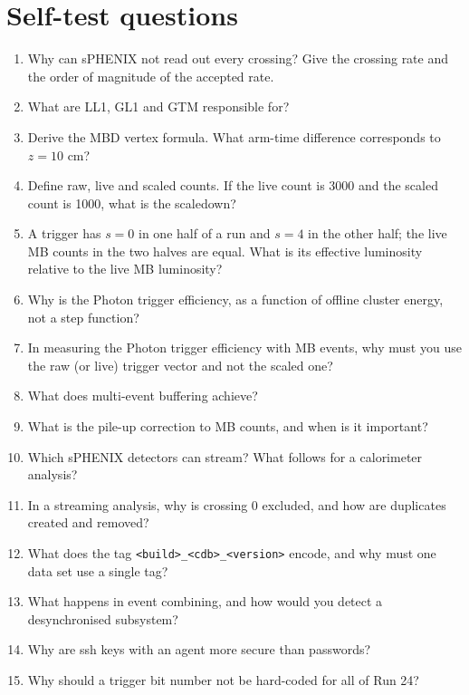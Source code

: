 \documentclass[11pt,letterpaper]{article}
\newcommand{\code}[1]{\texttt{#1}}
\begin{document}
\section{Self-test questions}
\begin{enumerate}
\item Why can sPHENIX not read out every crossing? Give the crossing rate and the order of magnitude of the accepted rate.
\item What are LL1, GL1 and GTM responsible for?
\item Derive the MBD vertex formula. What arm-time difference corresponds to $z=10$ cm?
\item Define raw, live and scaled counts. If the live count is 3000 and the scaled count is 1000, what is the scaledown?
\item A trigger has $s=0$ in one half of a run and $s=4$ in the other half; the live MB counts in the two halves are equal. What is its effective luminosity relative to the live MB luminosity?
\item Why is the Photon trigger efficiency, as a function of offline cluster energy, not a step function?
\item In measuring the Photon trigger efficiency with MB events, why must you use the raw (or live) trigger vector and not the scaled one?
\item What does multi-event buffering achieve?
\item What is the pile-up correction to MB counts, and when is it important?
\item Which sPHENIX detectors can stream? What follows for a calorimeter analysis?
\item In a streaming analysis, why is crossing 0 excluded, and how are duplicates created and removed?
\item What does the tag \code{<build>\_<cdb>\_<version>} encode, and why must one data set use a single tag?
\item What happens in event combining, and how would you detect a desynchronised subsystem?
\item Why are ssh keys with an agent more secure than passwords?
\item Why should a trigger bit number not be hard-coded for all of Run 24?
\end{enumerate}

\appendix
\end{document}
